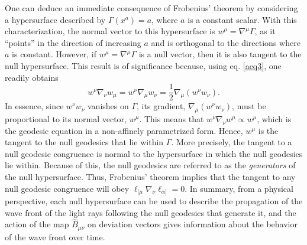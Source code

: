 \documentclass[
12pt,		%
openright,	%
twoside,  %
a4paper,			%
chapter=TITLE,		%
english,			%
french,				%
spanish,			%
brazil				%
]{USPSC-classe/USPSC}
\begin{document}
One can deduce an immediate consequence of Frobenius' theorem by considering a hypersurface described by $\Gamma(x^{a})=a$, where $a$ is a constant scalar. With this characterization, the normal vector to this hypersurface is $w^{\mu}=\nabla^{\mu}\Gamma$, as it “points” in the direction of increasing $a$ and is orthogonal to the directions where $a$ is constant. However, if $w^{\mu}=\nabla^{\mu}\Gamma$ is a null vector, then it is also tangent to the null hypersurface. This result is of significance because, using eq. \ref{aeq3}, one readily obtains
\begin{equation}
    w^{\nu}\nabla_{\nu}w_{\mu}=w^{\nu}\nabla_{\mu}w_{\nu}=\frac{1}{2}\nabla_{\mu}(w^{\nu}w_{\nu}).
\end{equation}
In essence, since $w^{\nu}w_{\nu}$ vanishes on $\Gamma$, its gradient, $\nabla_{\mu}(w^{\nu}w_{\nu})$, must be proportional to its normal vector, $w^{\mu}$. This means that $w^{\nu}\nabla_{\nu}w^{\mu}\propto w^{\mu}$, which is the geodesic equation in a non-affinely parametrized form. Hence, $w^{\mu}$ is the tangent to the null geodesics that lie within $\Gamma$. More precisely, the tangent to a null geodesic congruence is normal to the hypersurface in which the null geodesics lie within. Because of this, the null geodesics are referred to as the \textit{generators} of the null hypersurface. Thus, Frobenius' theorem implies that the tangent to any null geodesic congruence will obey $\ell_{[\mu}\nabla_{\nu}\ell_{\alpha]}=0$. In summary, from a physical perspective, each null hypersurface can be used to describe the propagation of the wave front of the light rays following the null geodesics that generate it, and the action of the map $\hat{B}_{\mu\nu}$ on deviation vectors gives information about the behavior of the wave front over time.
\end{document}
